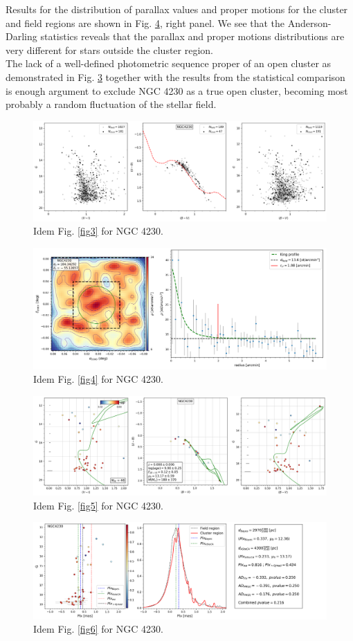 \documentclass[draft]{aa}
\begin{document}
Results for the distribution of parallax values and proper motions for the
cluster and field regions are shown in Fig. \ref{fig62}, right panel.
We see that the Anderson-Darling statistics reveals that the parallax and
proper motions distributions are very different for stars outside the
cluster region.\\

The lack of a well-defined photometric sequence proper of an open cluster as
demonstrated in Fig. \ref{fig61} together with the results from
the statistical comparison is enough argument to exclude NGC 4230 as a true open
cluster, becoming most probably a random fluctuation of the stellar field.

\begin{figure}[ht]
    \centering
    \includegraphics[width=\hsize]{../figs/obs_NGC4230.png}
    \caption{Idem Fig. \ref{fig3} for NGC 4230.}
    \label{fig59}
\end{figure}
\begin{figure}[ht]
    \centering
    \includegraphics[width=\hsize]{../figs/dmap_ngc4230.png}
    \caption{Idem Fig. \ref{fig4} for NGC 4230.}
    \label{fig60}
\end{figure}
\begin{figure}[ht]
    \centering
    \includegraphics[width=\hsize]{../figs/cmds_ngc4230.png}
    \caption{Idem Fig. \ref{fig5} for NGC 4230.}
    \label{fig61}
\end{figure}
\begin{figure}[ht]
    \centering
    \includegraphics[width=\hsize]{../figs/plx_NGC4230.png}
    \caption{Idem Fig. \ref{fig6} for NGC 4230.}
    \label{fig62}
\end{figure}
\end{document}
